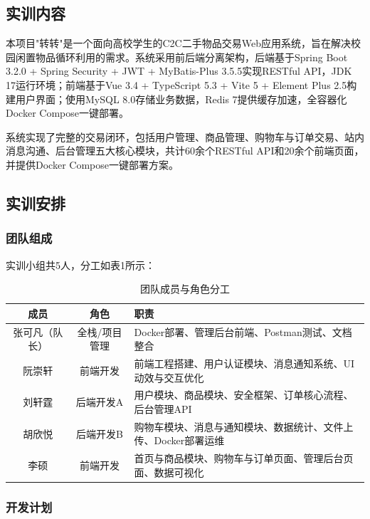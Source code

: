 \documentclass[12pt,a4paper,oneside]{ctexart}
\begin{document}
\subsection{实训内容}

本项目"转转"是一个面向高校学生的C2C二手物品交易Web应用系统，旨在解决校园闲置物品循环利用的需求。系统采用前后端分离架构，后端基于Spring Boot 3.2.0 + Spring Security + JWT + MyBatis-Plus 3.5.5实现RESTful API，JDK 17运行环境；前端基于Vue 3.4 + TypeScript 5.3 + Vite 5 + Element Plus 2.5构建用户界面；使用MySQL 8.0存储业务数据，Redis 7提供缓存加速，全容器化Docker Compose一键部署。

系统实现了完整的交易闭环，包括用户管理、商品管理、购物车与订单交易、站内消息沟通、后台管理五大核心模块，共计60余个RESTful API和20余个前端页面，并提供Docker Compose一键部署方案。

\subsection{实训安排}

\subsubsection{团队组成}

实训小组共5人，分工如表1所示：

\begin{table}[htbp]
\centering
\caption{团队成员与角色分工}
\label{tab:team}
\small
\begin{tabular}{|c|c|p{4.5cm}|}
\hline
\textbf{成员} & \textbf{角色} & \textbf{职责} \\
\hline
张可凡（队长） & 全栈/项目管理 & Docker部署、管理后台前端、Postman测试、文档整合 \\
\hline
阮崇轩 & 前端开发 & 前端工程搭建、用户认证模块、消息通知系统、UI动效与交互优化 \\
\hline
刘轩霆 & 后端开发A & 用户模块、商品模块、安全框架、订单核心流程、后台管理API \\
\hline
胡欣悦 & 后端开发B & 购物车模块、消息与通知模块、数据统计、文件上传、Docker部署运维 \\
\hline
李硕 & 前端开发 & 首页与商品模块、购物车与订单页面、管理后台页面、数据可视化 \\
\hline
\end{tabular}
\end{table}

\subsubsection{开发计划}
\end{document}
